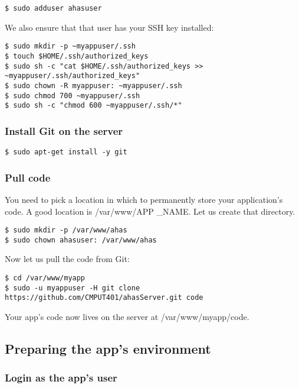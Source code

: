 \documentclass[11pt]{article}
\begin{document}
\begin{verbatim}
$ sudo adduser ahasuser
\end{verbatim}

We also ensure that that user has your SSH key installed:

\begin{verbatim}
$ sudo mkdir -p ~myappuser/.ssh
$ touch $HOME/.ssh/authorized_keys
$ sudo sh -c "cat $HOME/.ssh/authorized_keys >> ~myappuser/.ssh/authorized_keys"
$ sudo chown -R myappuser: ~myappuser/.ssh
$ sudo chmod 700 ~myappuser/.ssh
$ sudo sh -c "chmod 600 ~myappuser/.ssh/*"
\end{verbatim}

\subsubsection{Install Git on the server}
\label{sec:org432c124}

\begin{verbatim}
$ sudo apt-get install -y git
\end{verbatim}
\subsubsection{Pull code}
\label{sec:org757e675}

You need to pick a location in which to permanently store your application's code. A good location is /var/www/APP \_NAME. Let us create that directory.

\begin{verbatim}
$ sudo mkdir -p /var/www/ahas
$ sudo chown ahasuser: /var/www/ahas
\end{verbatim}

Now let us pull the code from Git:

\begin{verbatim}
$ cd /var/www/myapp
$ sudo -u myappuser -H git clone https://github.com/CMPUT401/ahasServer.git code
\end{verbatim}
Your app's code now lives on the server at /var/www/myapp/code.

\subsection{Preparing the app's environment}
\label{sec:orgb31b939}

\subsubsection{Login as the app's user}
\label{sec:org91290d3}
\end{document}
